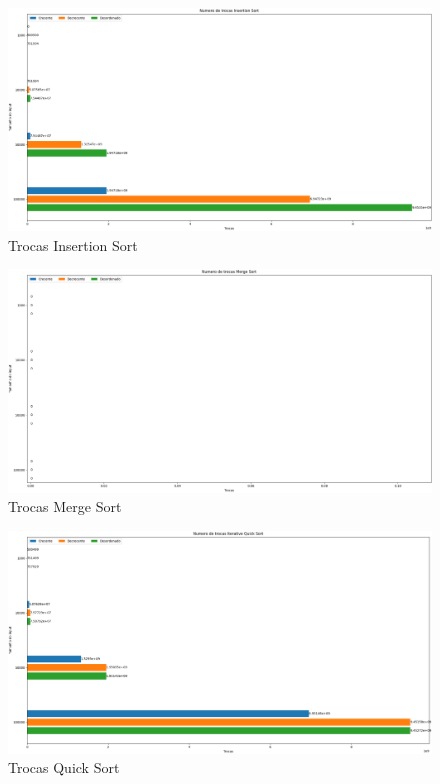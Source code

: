 \documentclass[12pt,a4paper]{article}
\begin{document}
\begin{figure}[H]
    \centering
    \includegraphics[width=\textwidth]{Graficos/Trocas/Insertion Sort.png}
    \caption{Trocas Insertion Sort}
    \label{fig:trocasInsertionSort}
\end{figure}

\begin{figure}[H]
    \centering
    \includegraphics[width=\textwidth]{Graficos/Trocas/Merge Sort.png}
    \caption{Trocas Merge Sort}
    \label{fig:trocasMergeSort}
\end{figure}

\begin{figure}[H]
    \centering
    \includegraphics[width=\textwidth]{Graficos/Trocas/Iterative Quick Sort.png}
    \caption{Trocas Quick Sort}
    \label{fig:trocasQuickSort}
\end{figure}
\end{document}
